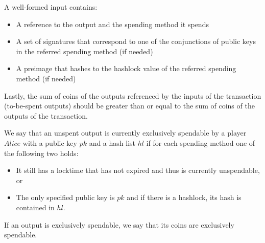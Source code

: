   A well-formed input contains:
  \begin{itemize}
    \item A reference to the output and the spending method it spends
    \item A set of signatures that correspond to one of the conjunctions of
    public keys in the referred spending method (if needed)
    \item A preimage that hashes to the hashlock value of the referred spending
    method (if needed)
  \end{itemize}

  Lastly, the sum of coins of the outputs referenced by the inputs of the
  transaction (to-be-spent outputs) should be greater than or equal to the sum
  of coins of the outputs of the transaction.

  We say that an unspent output is currently exclusively spendable by a player
  $Alice$ with a public key $pk$ and a hash list $hl$ if for each spending
  method one of the following two holds:
  \begin{itemize}
    \item It still has a locktime that has not expired and thus is currently
    unspendable, or
    \item The only specified public key is $pk$ and if there is a hashlock, its
    hash is contained in $hl$.
  \end{itemize}
  If an output is exclusively spendable, we say that its coins are exclusively
  spendable.
